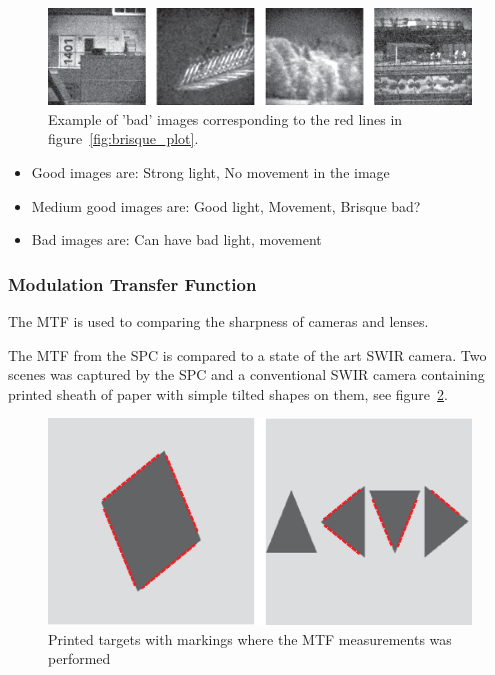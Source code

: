 \begin{figure}[H]
    \centering
    \includegraphics[width = 1\linewidth]{result/SPC_NRQA/bad.eps}
    \caption{Example of 'bad' images corresponding to the red lines in figure~\ref{fig:brisque_plot}.}
    \label{fig:bad_plot}
\end{figure}

\begin{itemize}
    \item Good images are: Strong light, No movement in the image
    \item Medium good images are: Good light, Movement, Brisque bad?
    \item Bad images are: Can have bad light, movement 
\end{itemize}


\subsubsection{Modulation Transfer Function}
The MTF is used to comparing the sharpness of cameras and lenses.  


The MTF from the SPC is compared to a state of the art SWIR camera. Two scenes was captured by the SPC and a conventional SWIR camera containing printed sheath of paper with simple tilted shapes on them, see figure~\ref{fig:mtf_target}. 



\begin{figure}[H]
    \centering
    \includegraphics[width=0.9\linewidth]{result/mtf/Target.eps}
    \caption{Printed targets with markings where the MTF measurements was performed}
    \label{fig:mtf_target}
\end{figure}

